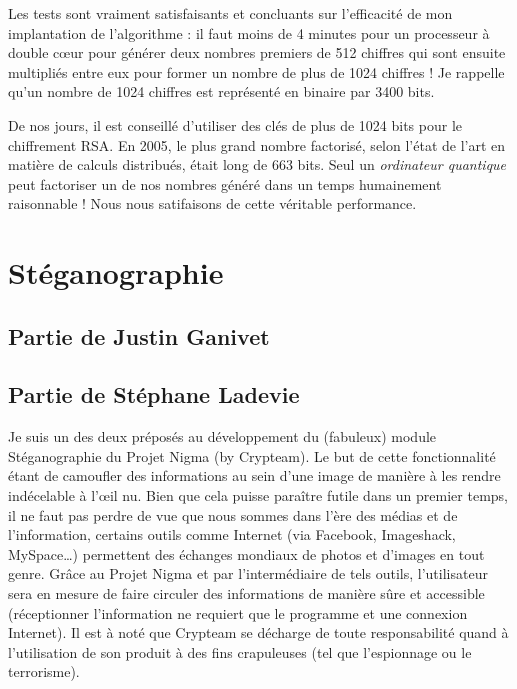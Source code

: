 \documentclass[a4paper,12pt]{article}
\begin{document}
Les tests sont vraiment satisfaisants et concluants sur l'efficacité de mon implantation de l'algorithme : il faut moins de 4 minutes pour un processeur à double c\oe{}ur pour générer deux nombres premiers de 512 chiffres qui sont ensuite multipliés entre eux pour former un nombre de plus de 1024 chiffres ! Je rappelle qu'un nombre de 1024 chiffres est représenté en binaire par 3400 bits.

De nos jours, il est conseillé d'utiliser des clés de plus de 1024 bits pour le chiffrement RSA. En 2005, le plus grand nombre factorisé, selon l'état de l'art en matière de calculs distribués, était long de 663 bits. Seul un \emph{ordinateur quantique} peut factoriser un de nos nombres généré dans un temps humainement raisonnable ! Nous nous satifaisons de cette véritable performance.

\newpage

\section{Stéganographie}

\subsection{Partie de Justin Ganivet}

\newpage

\subsection{Partie de Stéphane Ladevie}

Je suis un des deux préposés au développement du (fabuleux) module Stéganographie  du Projet Nigma (by Crypteam). Le but de cette fonctionnalité étant de camoufler des informations au sein d'une image de manière à les rendre indécelable à l'\oe{}il nu.
Bien que cela puisse paraître futile dans un premier temps, il ne faut pas perdre de vue que nous sommes dans l'ère des médias et de l'information, certains outils comme Internet (via Facebook, Imageshack, MySpace\dots{}) permettent des échanges mondiaux de photos et d'images en tout genre. Grâce au Projet Nigma et par l'intermédiaire de tels outils, l'utilisateur sera en mesure de faire circuler des informations de manière sûre et accessible (réceptionner l'information ne requiert que le programme et une connexion Internet). Il est à noté que Crypteam se décharge de toute responsabilité quand à l'utilisation de son produit à des fins crapuleuses (tel que l'espionnage ou le terrorisme).
\end{document}
